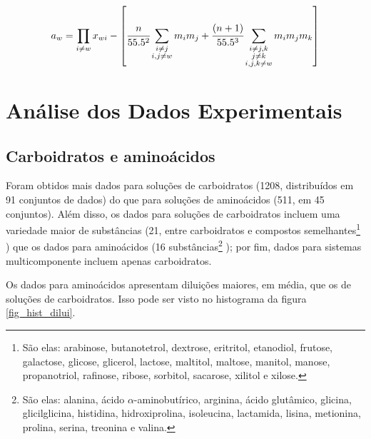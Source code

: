 \documentclass[
	12pt,				%
	openright,
	twoside,
	a4paper,			%
	english,			%
	french,				%
	brazil				%
	]{abntex2}
\begin{document}
\begin{equation}
	\label{eq_caurie_raoult}
	a_w = \prod_{i \neq w}x_{wi}-\left[\cfrac{n}%
	{55.5^2}\sum_{\substack{i \neq j \\ i,j \neq w}}%
	m_im_j + \cfrac{(n+1)}{55.5^3}\sum_{%
	\substack{i\neq j,k \\ j \neq k \\  i,j,k \neq w}}%
	m_im_jm_k\right]
\end{equation}

\chapter{Análise dos Dados Experimentais}

\section{Carboidratos e aminoácidos}

Foram obtidos mais dados para soluções de carboidratos (1208, distribuídos em
91 conjuntos de dados) do que para soluções de aminoácidos (511, em 45 conjuntos).
Além disso, os dados para soluções de carboidratos incluem uma variedade maior de
substâncias (21, entre carboidratos e compostos semelhantes\footnote{%
	São elas: arabinose, butanotetrol, dextrose, eritritol, etanodiol,
	frutose, galactose, glicose, glicerol, lactose, maltitol, maltose,
	manitol, manose, propanotriol, rafinose, ribose, sorbitol, sacarose,
	xilitol e xilose.
}
) que os dados para aminoácidos (16 substâncias\footnote{%
	São elas: alanina, ácido $\alpha$-aminobutírico, arginina, ácido
	glutâmico, glicina, glicilglicina, histidina, hidroxiprolina,
	isoleucina, lactamida, lisina, metionina, prolina, serina,
	treonina e valina.
}
); por fim, dados para sistemas multicomponente incluem apenas carboidratos.

Os dados para aminoácidos apresentam diluições maiores, em média, que os de
soluções de carboidratos. Isso pode ser visto no histograma da figura
\ref{fig_hist_dilui}.
\end{document}
